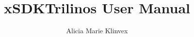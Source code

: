 \documentclass[pdf,12pt,report,strict]{SANDreport}
\title{xSDKTrilinos User Manual}
\author{Alicia Marie Klinvex}
\begin{document}
\maketitle



%


\SANDmain




\end{document}
